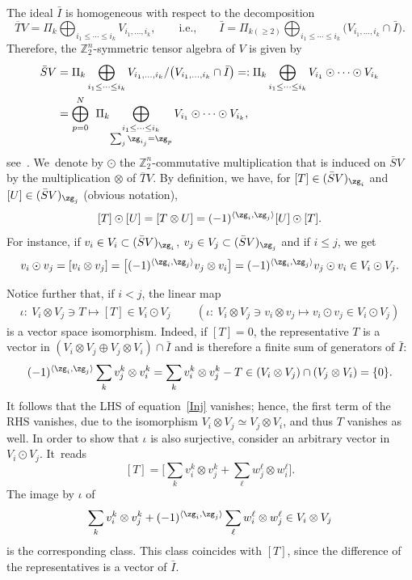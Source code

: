 \documentclass[pdftex]{sigma}%
\newcommand{\Z}{{\mathbb Z}}
\def\la{\langle}
\newcommand{\0}{\otimes}
\numberwithin{equation}{section}
\begin{document}
The ideal $\bar I$ is homogeneous with respect to the decomposition
\[
\overline{T}V=\Pi_k\bigoplus_{i_1\le\cdots\le i_k}V_{i_1,\dots, i_k},\qquad\text{i.e.,}\qquad \bar I=\Pi_{k(\ge 2)}\bigoplus_{i_1\le\cdots\le i_k}\big(V_{i_1,\dots, i_k}\cap \bar I\big).
\]
Therefore, the $\Z_2^n$-symmetric tensor algebra of $V$ is given by
\begin{align}
\bar{S}V&=\Pi_k \bigoplus_{i_1\le\cdots\le i_k} V_{i_1,\dots,i_k}/\big(V_{i_1,\dots,i_k}\cap \bar I\big)=:\Pi_k \bigoplus_{i_1\le\cdots\le i_k} V_{i_1}\odot\cdots\odot V_{i_k}\nonumber
\\ \label{GraSymTenAlg}
&=\bigoplus_{p=0}^N\;\,\Pi_k\! \bigoplus_{\begin{subarray}{c}{i_1\le\cdots\le i_k}\\ {\sum_j\zg_{i_j}=\zg_p}\end{subarray}} V_{i_1}\odot\cdots\odot V_{i_k},
\end{align}
see~\cite{BP13}. We~denote by $\odot$ the $\Z_2^n$-commutative multiplication that is induced on $\bar{S}V$ by the multiplication $\0$ of $\overline{T}V$. By definition, we have, for $[T]\in (\bar S V)_{\zg_i}$ and $[U]\in (\bar S V)_{\zg_j}$ (obvious notation),
\[
[T]\odot[U]=[T\0 U]=(-1)^{\la \zg_i,\zg_j\rangle}[U]\odot[T].
\]
For instance, if $v_i\in V_i\subset(\bar{S}V)_{\zg_i}$, $v_j\in V_j\subset(\bar{S}V)_{\zg_j}$ and if $i\le j$, we get
\begin{gather}\label{GraCom}
v_i\odot v_j=[v_i\0 v_j] =\big[(-1)^{\la\zg_i,\zg_j\rangle}v_j\0v_i\big] =(-1)^{\la\zg_i,\zg_j\rangle}v_j\odot v_i\in V_i\odot V_j.
\end{gather}

Notice further that, if $i<j$, the linear map
\begin{gather}\label{CanIsoTen}
\iota\colon\ V_i\0 V_j\ni T\mapsto [T]\in V_i\odot V_j\qquad\ (\iota\colon\ V_i\0 V_j\ni v_i\0 v_j\mapsto v_i\odot v_j\in V_i\odot V_j)
\end{gather}
is a vector space isomorphism. Indeed, if $[T]=0$, the representative $T$ is a vector in $(V_i\0 V_j\oplus V_j\0 V_i)\cap\bar I$ and is therefore a finite sum of generators of $\bar I$:
\begin{gather}\label{Inj}
(-1)^{\la \zg_i,\zg_j\rangle}\sum_kv^k_j\0 v^k_i=\sum_kv^k_i\0 v^k_j-T\in (V_i\0 V_j)\cap(V_j\0 V_i)=\{0\}.
\end{gather}
It follows that the {\small LHS} of
equation~\eqref{Inj} vanishes; hence, the first term of the {\small RHS} vanishes, due to the isomorphism $V_i\0 V_j\simeq V_j\0 V_i$, and thus $T$ vanishes as well. In order to show that $\iota$ is also surjective, consider an arbitrary vector in $V_i\odot V_j$. It~reads
\[
[T]=\bigg[\sum_k v_i^k\0 v_j^k+\sum_\ell w_j^\ell\0 w_i^\ell\bigg].
\]
The image by $\iota$ of
\[
\sum_k v_i^k\0 v_j^k+(-1)^{\la\zg_i,\zg_j\rangle}\sum_\ell w_i^\ell\0 w_j^\ell\in V_i\0 V_j
\]
is the corresponding class. This class coincides with $[T]$, since the difference of the representatives is a vector of $\bar I$.
\end{document}

